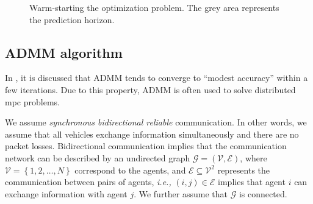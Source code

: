 \begin{figure}[!htbp]
    \centering
    
    
    \caption{Warm-starting the optimization problem. The grey area represents the prediction horizon.}
    \label{fig:warm_start}
\end{figure}



\subsection{ADMM algorithm}



In \cite{boyd_2011_distributed}, it is discussed that ADMM tends to converge to ``modest accuracy'' within a few iterations.
Due to this property, ADMM is often used to solve distributed \gls{mpc} problems.

We assume \emph{synchronous bidirectional reliable} communication.
In other words, we assume that all vehicles exchange information simultaneously and there are no packet losses.
Bidirectional communication implies that the communication network can be described by an undirected graph $\mathcal{G} = \left(\mathcal{V}, \mathcal{E}\right)$, where $\mathcal{V} = \left\{1, 2, \ldots, N\right\}$ correspond to the agents, and $\mathcal{E} \subseteq \mathcal{V}^2$ represents the communication between pairs of agents, \emph{i.e.,} $(i,j) \in \mathcal{E}$ implies that agent $i$ can exchange information with agent $j$. We further assume that $\mathcal{G}$ is connected.

